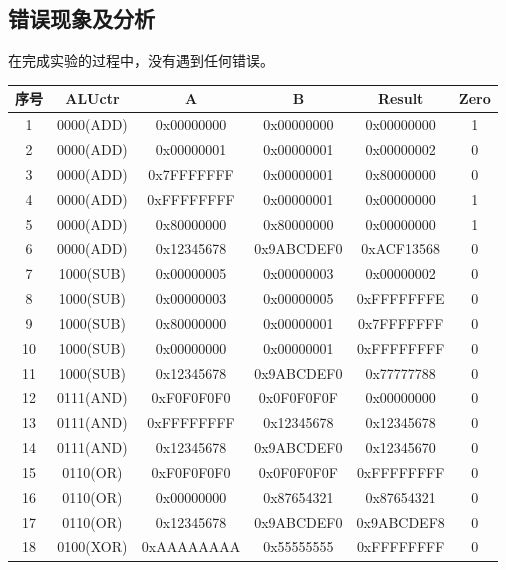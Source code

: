 \documentclass[12pt, a4paper]{ctexart}
\begin{document}
\subsection{错误现象及分析}

在完成实验的过程中，没有遇到任何错误。

\begin{table}[H]
    \centering
    \begin{tabular}{|c|c|c|c|c|c|}
        \hline
        序号 & ALUctr & A & B & Result & Zero \\ \hline
        1 & 0000(ADD) & 0x00000000 & 0x00000000 & 0x00000000 & 1 \\ \hline
        2 & 0000(ADD) & 0x00000001 & 0x00000001 & 0x00000002 & 0 \\ \hline
        3 & 0000(ADD) & 0x7FFFFFFF & 0x00000001 & 0x80000000 & 0 \\ \hline
        4 & 0000(ADD) & 0xFFFFFFFF & 0x00000001 & 0x00000000 & 1 \\ \hline
        5 & 0000(ADD) & 0x80000000 & 0x80000000 & 0x00000000 & 1 \\ \hline
        6 & 0000(ADD) & 0x12345678 & 0x9ABCDEF0 & 0xACF13568 & 0 \\ \hline
        7 & 1000(SUB) & 0x00000005 & 0x00000003 & 0x00000002 & 0 \\ \hline
        8 & 1000(SUB) & 0x00000003 & 0x00000005 & 0xFFFFFFFE & 0 \\ \hline
        9 & 1000(SUB) & 0x80000000 & 0x00000001 & 0x7FFFFFFF & 0 \\ \hline
        10 & 1000(SUB) & 0x00000000 & 0x00000001 & 0xFFFFFFFF & 0 \\ \hline
        11 & 1000(SUB) & 0x12345678 & 0x9ABCDEF0 & 0x77777788 & 0 \\ \hline
        12 & 0111(AND) & 0xF0F0F0F0 & 0x0F0F0F0F & 0x00000000 & 0 \\ \hline
        13 & 0111(AND) & 0xFFFFFFFF & 0x12345678 & 0x12345678 & 0 \\ \hline
        14 & 0111(AND) & 0x12345678 & 0x9ABCDEF0 & 0x12345670 & 0 \\ \hline
        15 & 0110(OR) & 0xF0F0F0F0 & 0x0F0F0F0F & 0xFFFFFFFF & 0 \\ \hline
        16 & 0110(OR) & 0x00000000 & 0x87654321 & 0x87654321 & 0 \\ \hline
        17 & 0110(OR) & 0x12345678 & 0x9ABCDEF0 & 0x9ABCDEF8 & 0 \\ \hline
        18 & 0100(XOR) & 0xAAAAAAAA & 0x55555555 & 0xFFFFFFFF & 0 \\ \hline

\end{tabular}
\end{table}
\end{document}
